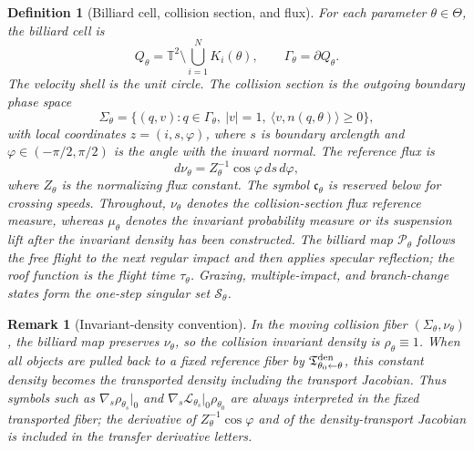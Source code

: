 \documentclass[11pt]{amsart}
\theoremstyle{compactplain}
\theoremstyle{compactdefinition}
\newtheorem*{definition*}{Definition}
\theoremstyle{compactremark}
\newtheorem*{remark*}{Remark}
\newcommand{\T}{\mathbb T}
\newcommand{\Ltransfer}{\mathscr L}
\newcommand{\Thetacal}{\Theta}
\newcommand{\Pcal}{\mathcal P}
\newcommand{\Ssing}{\mathcal S}
\begin{document}
\begin{definition*}[Billiard cell, collision section, and flux]
For each parameter $\theta\in\Thetacal$, the billiard cell is
\begin{equation}
  Q_\theta=\T^2\setminus\bigcup_{i=1}^N K_i(\theta),
  \qquad \Gamma_\theta=\partial Q_\theta .
\end{equation}
The velocity shell is the unit circle.  The collision section is the outgoing
boundary phase space
\begin{equation}
  \Sigma_\theta
  =\{(q,v):q\in\Gamma_\theta,\ |v|=1,\ \langle v,n(q,\theta)\rangle\ge0\},
\end{equation}
with local coordinates $z=(i,s,\varphi)$, where $s$ is boundary arclength and
$\varphi\in(-\pi/2,\pi/2)$ is the angle with the inward normal.  The reference
flux is
\begin{equation}
  d\nu_\theta=Z_\theta^{-1}\cos\varphi\,ds\,d\varphi ,
\end{equation}
where \(Z_\theta\) is the normalizing flux constant.  The symbol
\(\mathfrak c_\theta\) is reserved below for crossing speeds.  Throughout,
\(\nu_\theta\) denotes the collision-section flux reference measure, whereas
\(\mu_\theta\) denotes the invariant probability measure or its suspension lift
after the invariant density has been constructed.
The billiard map $\Pcal_\theta$ follows the free flight to the next regular
impact and then applies specular reflection; the roof function is the flight
time $\tau_\theta$.  Grazing, multiple-impact, and branch-change states form the
one-step singular set $\Ssing_\theta$.
\end{definition*}

\begin{remark*}[Invariant-density convention]
In the moving collision fiber \((\Sigma_\theta,\nu_\theta)\), the billiard map
preserves \(\nu_\theta\), so the collision invariant density is
\(\rho_\theta\equiv1\).  When all objects are pulled back to a fixed reference
fiber by \(\mathfrak T^{\rm den}_{\theta_0\leftarrow\theta}\), this constant
density becomes the transported density including the transport Jacobian.  Thus
symbols such as \(\nabla_s\rho_{\theta_s}|_0\) and
\(\nabla_s\Ltransfer_{\theta_s}|_0\rho_{\theta_0}\) are always interpreted in
the fixed transported fiber; the derivative of \(Z_\theta^{-1}\cos\varphi\) and
of the density-transport Jacobian is included in the transfer derivative
letters.
\end{remark*}
\end{document}
